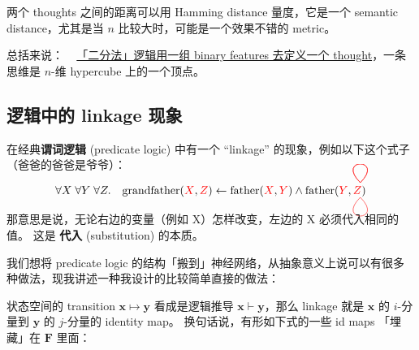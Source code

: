 \documentclass[orivec]{llncs}
\newcommand{\emp}[1]{\textbf{\textcolor{Cerulean}{#1}}}
\newcommand{\vect}[1]{\boldsymbol{#1}}
\newcommand{\tikzmark}[1]{\tikz[overlay,remember picture] \node (#1) {};}
\begin{document}
两个 thoughts 之间的距离可以用 Hamming distance 量度，它是一个 semantic distance，尤其是当 $n$ 比较大时，可能是一个效果不错的 metric。 

总括来说： ~ \underline{「二分法」逻辑用一组 binary features 去定义一个 thought}，一条思维是 $n$-维 hypercube 上的一个顶点。


\subsection{逻辑中的 linkage 现象}

在经典\textbf{谓词逻辑} (predicate logic) 中有一个 ``linkage'' 的现象，例如以下这个式子（爸爸的爸爸是爷爷）：

\begin{equation}
\forall X \; \forall Y \; \forall Z.  \quad  \text{grandfather}({\color{red}X} \tikzmark{x}, {\color{red}Z} \tikzmark{z}) \leftarrow \text{father}({\color{red}X} \tikzmark{p}, {\color{red}Y} \tikzmark{y}) \wedge \mbox{father}({\color{red}Y} \tikzmark{q}, {\color{red}Z} \tikzmark{r})
\begin{tikzpicture}[overlay,remember picture,out=45,in=135,distance=1.1cm]
  \draw[-,red, transform canvas={shift={(-5pt,10pt)}}] (x.center) to (p.center);
  \draw[-,red, transform canvas={shift={(-5pt,10pt)}}] (y.center) to (q.center);
  \draw[-,red, transform canvas={shift={(-5pt,-3pt)}}, out=-45,in=225] (z.center) to (r.center);
\end{tikzpicture}
\label{linkage-father}
\end{equation}

那意思是说，无论右边的变量（例如 X）怎样改变，左边的 X 必须代入相同的值。 这是 \emp{代入} (substitution) 的本质。



我们想将 predicate logic 的结构「搬到」神经网络，从抽象意义上说可以有很多种做法，现我讲述一种我设计的比较简单直接的做法：  

状态空间的 transition $\vect{x} \mapsto \vect{y}$ 看成是逻辑推导 $\vect{x} \vdash \vect{y}$，那么 linkage 就是 $\vect{x}$ 的 $i$-分量到 $\vect{y}$ 的 $j$-分量的 identity map。 换句话说，有形如下式的一些 id maps 「埋藏」在 $\vect{F}$ 里面：
\end{document}
